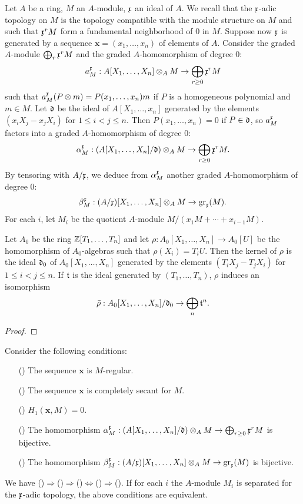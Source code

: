 Let $A$ be a ring, $M$ an $A$-module, $\mathfrak{x}$ an ideal of $A$. We recall that the $\mathfrak{x}$-adic topology on $M$ is the topology compatible with the module structure on $M$ and such that $\mathfrak{x}^rM$ form a fundamental neighborhood of $0$ in $M$. Suppose now $\mathfrak{x}$ is generated by a sequence $\bm{x}=(x_1,\dots,x_n)$ of elements of $A$. Consider the graded $A$-module $\bigoplus_r\mathfrak{x}^rM$ and the graded $A$-homomorphism of degree $0$:
\[a_M^{\mathfrak{x}}:A[X_1,\dots,X_n]\otimes_AM\to\bigoplus_{r\geq 0}\mathfrak{x}^rM\] 
such that $a_M^{\mathfrak{x}}(P\otimes m)=P(x_1,\dots,x_n)m$ if $P$ is a homogeneous polynomial and $m\in M$. Let $\mathfrak{d}$ be the ideal of $A[X_1,\dots,x_n]$ generated by the elements $(x_iX_j-x_jX_i)$ for $1\leq i<j\leq n$. Then $P(x_1,\dots,x_n)=0$ if $P\in\mathfrak{d}$, so $a_M^{\mathfrak{x}}$ factors into a graded $A$-homomorphism of degree $0$:
\[\alpha_M^{\mathfrak{x}}:(A[X_1,\dots,X_n]/\mathfrak{d})\otimes_AM\to\bigoplus_{r\geq 0}\mathfrak{x}^rM.\]
By tensoring with $A/\mathfrak{x}$, we deduce from $\alpha_M^{\mathfrak{x}}$ another graded $A$-homomorphism of degree $0$:
\[\beta_M^{\mathfrak{x}}:(A/\mathfrak{x})[X_1,\dots,X_n]\otimes_AM\to\mathrm{gr}_{\mathfrak{x}}(M).\]
For each $i$, let $M_i$ be the quotient $A$-module $M/(x_1M+\cdots+x_{i-1}M)$.
\begin{lemma}\label{polynomial ring iterated multiplication map kernel char}
Let $A_0$ be the ring $\mathbb{Z}[T_1,\dots,T_n]$ and let $\rho:A_0[X_1,\dots,X_n]\to A_0[U]$ be the homomorphism of $A_0$-algebras such that $\rho(X_i)=T_iU$. Then the kernel of $\rho$ is the ideal $\mathfrak{d}_0$ of $A_0[X_1,\dots,X_n]$ generated by the elements $(T_iX_j-T_jX_i)$ for $1\leq i<j\leq n$. If $\mathfrak{t}$ is the ideal generated by $(T_1,\dots,T_n)$, $\rho$ induces an isomorphism
\[\bar{\rho}:A_0[X_1,\dots,X_n]/\mathfrak{d}_0\to\bigoplus_n\mathfrak{t}^n.\] 
\end{lemma}
\begin{proof}

\end{proof}
\begin{theorem}\label{Koszul complex completely secant annd regular relation}
Consider the following conditions:
\begin{itemize}
\item[(\rmnum{1})] The sequence $\bm{x}$ is $M$-regular.
\item[(\rmnum{2})] The sequence $\bm{x}$ is completely secant for $M$.
\item[(\rmnum{3})] $H_1(\bm{x},M)=0$.
\item[(\rmnum{4})] The homomorphism $\alpha_M^{\mathfrak{x}}:(A[X_1,\dots,X_n]/\mathfrak{d})\otimes_AM\to\bigoplus_{r\geq 0}\mathfrak{x}^rM$ is bijective.
\item[(\rmnum{5})] The homomorphism $\beta_M^{\mathfrak{x}}:(A/\mathfrak{x})[X_1,\dots,X_n]\otimes_AM\to\mathrm{gr}_{\mathfrak{x}}(M)$ is bijective.
\end{itemize}
We have ()$\Rightarrow$()$\Rightarrow$()$\Leftrightarrow$()$\Rightarrow$(). If for each $i$ the $A$-module $M_i$ is separated for the $\mathfrak{x}$-adic topology, the above conditions are equivalent. 
\end{theorem}
